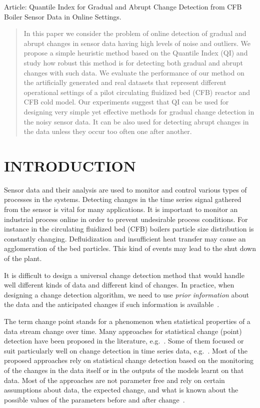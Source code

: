 Article: Quantile Index for Gradual and Abrupt Change Detection from CFB Boiler Sensor Data in Online Settings.

\begin{abstract}
In this paper we consider the problem of online detection of gradual and abrupt changes in sensor data having high levels of noise and outliers.
We propose a simple heuristic method based on the Quantile Index (QI) and study how robust this method is for detecting both gradual and abrupt changes with such data.
We evaluate the performance of our method on the artificially generated and real datasets that represent different operational settings of a pilot circulating fluidized bed (CFB) reactor and CFB cold model. 
Our experiments suggest that QI can be used for designing very simple yet effective methods for gradual change detection in the noisy sensor data. It can be also used for detecting abrupt changes in the data unless they occur too often one after another.
\end{abstract}

\section{INTRODUCTION}
Sensor data and their analysis are used to monitor and control various types of processes in the systems.
Detecting changes in the time series signal gathered from the sensor is vital for many applications.
It is important to monitor an industrial process online in order to prevent undesirable process conditions.
For instance in the circulating fluidized bed (CFB) boilers particle size distribution is constantly changing.
Defluidization and insufficient heat transfer may cause an agglomeration of the bed particles.
This kind of events may lead to the shut down of the plant.

It is difficult to design a universal change detection method that would handle well different kinds of data and different kind of changes.
In practice, when designing a change detection algorithm, we need to use \emph{prior information} about the data and the anticipated changes if such information is available~\cite{I.V.Nikiforov}.

The term change point stands for a phenomenon when statistical properties of a data stream change over time.
Many approaches for statistical change (point) detection have been proposed in the literature, e.g.~\cite{Aggarwal05,Dasu06}. Some of them focused or suit particularly well on change detection in time series data, e.g.~\cite{journals/tkde/TakeuchiY06,cusum,BifetG07}.
Most of the proposed approaches rely on statistical change detection based on the monitoring of the changes in the data itself or in the outputs of the models learnt on that data. Most of the approaches are not parameter free and rely on certain assumptions about data, the expected change, and what is known about the possible values of the parameters before and after change~\cite{I.V.Nikiforov}.

